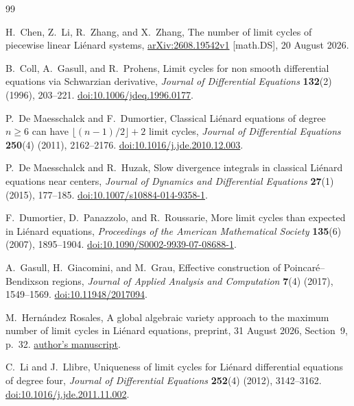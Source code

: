 \begin{thebibliography}{99}
\raggedright

H.~Chen, Z.~Li, R.~Zhang, and X.~Zhang,
The number of limit cycles of piecewise linear Li\'enard systems,
\href{https://arxiv.org/abs/2608.19542v1}{arXiv:2608.19542v1}
[math.DS], 20 August 2026.

B.~Coll, A.~Gasull, and R.~Prohens,
Limit cycles for non smooth differential equations via Schwarzian derivative,
\emph{Journal of Differential Equations} \textbf{132}(2)
(1996), 203--221.
\href{https://doi.org/10.1006/jdeq.1996.0177}{doi:10.1006/jdeq.1996.0177}.

P.~De Maesschalck and F.~Dumortier,
Classical Li\'enard equations of degree $n\ge6$ can have
$\lfloor(n-1)/2\rfloor+2$ limit cycles,
\emph{Journal of Differential Equations} \textbf{250}(4)
(2011), 2162--2176.
\href{https://doi.org/10.1016/j.jde.2010.12.003}{doi:10.1016/j.jde.2010.12.003}.

P.~De Maesschalck and R.~Huzak,
Slow divergence integrals in classical Li\'enard equations near centers,
\emph{Journal of Dynamics and Differential Equations}
\textbf{27}(1) (2015), 177--185.
\href{https://doi.org/10.1007/s10884-014-9358-1}{doi:10.1007/s10884-014-9358-1}.

F.~Dumortier, D.~Panazzolo, and R.~Roussarie,
More limit cycles than expected in Li\'enard equations,
\emph{Proceedings of the American Mathematical Society}
\textbf{135}(6) (2007), 1895--1904.
\href{https://doi.org/10.1090/S0002-9939-07-08688-1}{doi:10.1090/S0002-9939-07-08688-1}.

A.~Gasull, H.~Giacomini, and M.~Grau,
Effective construction of Poincar\'e--Bendixson regions,
\emph{Journal of Applied Analysis and Computation}
\textbf{7}(4) (2017), 1549--1569.
\href{https://doi.org/10.11948/2017094}{doi:10.11948/2017094}.

M.~Hern\'andez Rosales,
A global algebraic variety approach to the maximum number of limit
cycles in Li\'enard equations,
preprint, 31 August 2026, Section~9, p.~32.
\href{https://www.researchgate.net/profile/Manuel-Rosales-2/publication/404693751_A_bound_for_the_maximum_number_of_limit_cycles_of_the_Lienard_equation/links/6ac3d9555770bb0daeda4d14/A-bound-for-the-maximum-number-of-limit-cycles-of-the-Lienard-equation.pdf}{author's manuscript}.

C.~Li and J.~Llibre,
Uniqueness of limit cycles for Li\'enard differential equations
of degree four,
\emph{Journal of Differential Equations} \textbf{252}(4)
(2012), 3142--3162.
\href{https://doi.org/10.1016/j.jde.2011.11.002}{doi:10.1016/j.jde.2011.11.002}.


\end{thebibliography}

